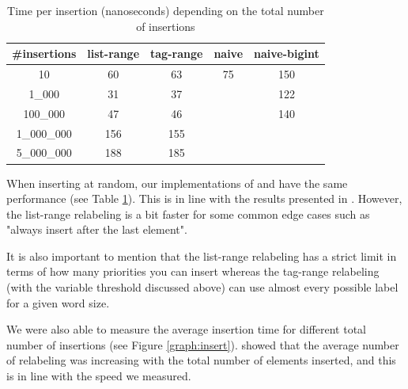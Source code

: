 \documentclass[12pt]{article}
\begin{document}
\begin{table}[h!]
    \begin{center}
        \begin{tabular}{|c | c c c c|}
            \hline
            \#insertions & list-range & tag-range & naive & naive-bigint \\ [0.5ex]
            \hline
            10           & 60         & 63        & 75    & 150          \\
            \hline
            1\_000       & 31         & 37        &       & 122          \\
            \hline
            100\_000     & 47         & 46        &       & 140          \\
            \hline
            1\_000\_000  & 156        & 155       &       &              \\
            \hline
            5\_000\_000  & 188        & 185       &       &              \\
            \hline
        \end{tabular}

        \caption{Time per insertion (nanoseconds) depending on the total number of insertions}
        \label{table:insert}

    \end{center}
\end{table}

When inserting at random, our implementations of \cite{10.1145/28395.28434} and \cite{10.5555/647912.740822} have the same performance (see Table \ref{table:insert}). This is in line with the results presented in \cite{10.5555/647912.740822}. However, the list-range relabeling is a bit faster for some common edge cases such as "always insert after the last element".

It is also important to mention that the list-range relabeling has a strict limit in terms of how many priorities you can insert whereas the tag-range relabeling (with the variable threshold discussed above) can use almost every possible label for a given word size.

We were also able to measure the average insertion time for different total number of insertions (see Figure \ref{graph:insert}). \cite{10.5555/647912.740822} showed that the average number of relabeling was increasing with the total number of elements inserted, and this is in line with the speed we measured.
\end{document}
